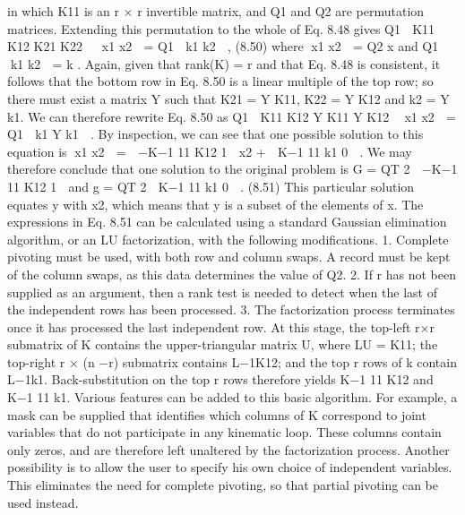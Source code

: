 in which K11 is an r × r invertible matrix, and Q1 and Q2 are permutation matrices. Extending this permutation to the whole of Eq. 8.48 gives Q1  K11 K12 K21 K22   x1 x2  = Q1  k1 k2  , (8.50) where x1 x2  = Q2 x and Q1 k1 k2  = k . Again, given that rank(K) = r and that Eq. 8.48 is consistent, it follows that the bottom row in Eq. 8.50 is a linear multiple of the top row; so there must exist a matrix Y such that K21 = Y K11, K22 = Y K12 and k2 = Y k1. We can therefore rewrite Eq. 8.50 as Q1  K11 K12 Y K11 Y K12  x1 x2  = Q1  k1 Y k1  . By inspection, we can see that one possible solution to this equation is x1 x2  =  −K−1 11 K12 1  x2 +  K−1 11 k1 0  . We may therefore conclude that one solution to the original problem is G = QT 2  −K−1 11 K12 1  and g = QT 2  K−1 11 k1 0  . (8.51) This particular solution equates y with x2, which means that y is a subset of the elements of x. The expressions in Eq. 8.51 can be calculated using a standard Gaussian elimination algorithm, or an LU factorization, with the following modifications. 1. Complete pivoting must be used, with both row and column swaps. A record must be kept of the column swaps, as this data determines the value of Q2. 2. If r has not been supplied as an argument, then a rank test is needed to detect when the last of the independent rows has been processed. 3. The factorization process terminates once it has processed the last independent row. At this stage, the top-left r×r submatrix of K contains the upper-triangular matrix U, where LU = K11; the top-right r × (n −r) submatrix contains L−1K12; and the top r rows of k contain L−1k1. Back-substitution on the top r rows therefore yields K−1 11 K12 and K−1 11 k1. Various features can be added to this basic algorithm. For example, a mask can be supplied that identifies which columns of K correspond to joint variables that do not participate in any kinematic loop. These columns contain only zeros, and are therefore left unaltered by the factorization process. Another possibility is to allow the user to specify his own choice of independent variables. This eliminates the need for complete pivoting, so that partial pivoting can be used instead.

